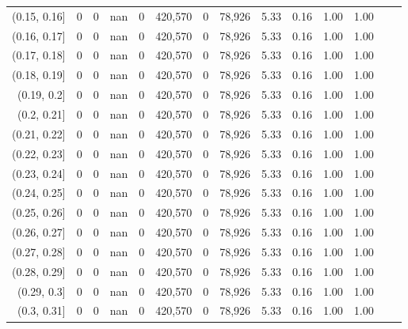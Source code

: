 \begin{tabular}{rrrrrrrrrrrrrr}
(0.15, 0.16]   &        0 &       0 &    nan &        0 &  420,570 &       0 &  78,926 &  5.33 &  0.16 &  1.00 &      1.00 \\
(0.16, 0.17]   &        0 &       0 &    nan &        0 &  420,570 &       0 &  78,926 &  5.33 &  0.16 &  1.00 &      1.00 \\
(0.17, 0.18]   &        0 &       0 &    nan &        0 &  420,570 &       0 &  78,926 &  5.33 &  0.16 &  1.00 &      1.00 \\
(0.18, 0.19]   &        0 &       0 &    nan &        0 &  420,570 &       0 &  78,926 &  5.33 &  0.16 &  1.00 &      1.00 \\
(0.19, 0.2]    &        0 &       0 &    nan &        0 &  420,570 &       0 &  78,926 &  5.33 &  0.16 &  1.00 &      1.00 \\
(0.2, 0.21]    &        0 &       0 &    nan &        0 &  420,570 &       0 &  78,926 &  5.33 &  0.16 &  1.00 &      1.00 \\
(0.21, 0.22]   &        0 &       0 &    nan &        0 &  420,570 &       0 &  78,926 &  5.33 &  0.16 &  1.00 &      1.00 \\
(0.22, 0.23]   &        0 &       0 &    nan &        0 &  420,570 &       0 &  78,926 &  5.33 &  0.16 &  1.00 &      1.00 \\
(0.23, 0.24]   &        0 &       0 &    nan &        0 &  420,570 &       0 &  78,926 &  5.33 &  0.16 &  1.00 &      1.00 \\
(0.24, 0.25]   &        0 &       0 &    nan &        0 &  420,570 &       0 &  78,926 &  5.33 &  0.16 &  1.00 &      1.00 \\
(0.25, 0.26]   &        0 &       0 &    nan &        0 &  420,570 &       0 &  78,926 &  5.33 &  0.16 &  1.00 &      1.00 \\
(0.26, 0.27]   &        0 &       0 &    nan &        0 &  420,570 &       0 &  78,926 &  5.33 &  0.16 &  1.00 &      1.00 \\
(0.27, 0.28]   &        0 &       0 &    nan &        0 &  420,570 &       0 &  78,926 &  5.33 &  0.16 &  1.00 &      1.00 \\
(0.28, 0.29]   &        0 &       0 &    nan &        0 &  420,570 &       0 &  78,926 &  5.33 &  0.16 &  1.00 &      1.00 \\
(0.29, 0.3]    &        0 &       0 &    nan &        0 &  420,570 &       0 &  78,926 &  5.33 &  0.16 &  1.00 &      1.00 \\
(0.3, 0.31]    &        0 &       0 &    nan &        0 &  420,570 &       0 &  78,926 &  5.33 &  0.16 &  1.00 &      1.00 \\

\end{tabular}
